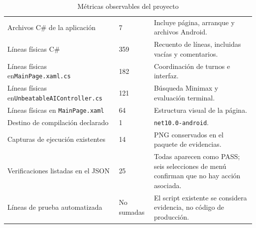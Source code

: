 \begin{table}[H]
\centering
\caption{Métricas observables del proyecto}
\label{tab:metrics}
\begin{tabular}{P{5.0cm}P{2.6cm}P{7.0cm}}
\toprule
{} &  & \\
\midrule
Archivos C\# de la aplicación & 7 & Incluye página, arranque y archivos Android.\\
Líneas físicas C\# & 359 & Recuento de líneas, incluidas vacías y comentarios.\\
Líneas físicas en\newline \texttt{MainPage.xaml.cs} & 182 & Coordinación de turnos e interfaz.\\
Líneas físicas en\newline \texttt{UnbeatableAI}\allowbreak\texttt{Controller.cs} & 121 & Búsqueda Minimax y evaluación terminal.\\
Líneas físicas en \texttt{MainPage.xaml} & 64 & Estructura visual de la página.\\
Destino de compilación declarado & 1 & \texttt{net10.0-android}.\\
Capturas de ejecución existentes & 14 & PNG conservados en el paquete de evidencias.\\
Verificaciones listadas en el JSON & 25 & Todas aparecen como PASS; seis selecciones de menú confirman que no hay acción asociada.\\
Líneas de prueba automatizada & No sumadas & El script existente se considera evidencia, no código de producción.\\
\bottomrule
\end{tabular}
\end{table}

